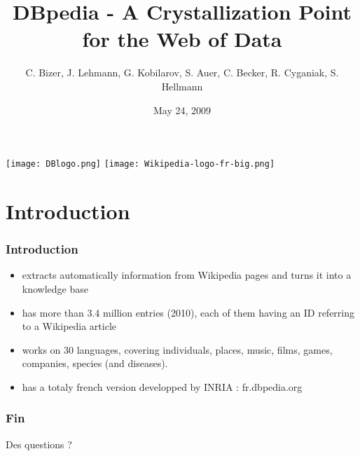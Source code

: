 \documentclass{beamer}
\title{DBpedia - A Crystallization Point for the Web of Data}
\author{C. Bizer, J. Lehmann, G. Kobilarov, S. Auer, C. Becker, R. Cyganiak, S. Hellmann}
\date{May 24, 2009}
\begin{document}
  	
  	\begin{frame}
  		
  		\begin{center}
  			\texttt{[image: DBlogo.png]} \text{                     } \texttt{[image: Wikipedia-logo-fr-big.png]}
  		\end{center}
  		\titlepage
  	\end{frame}
  	
  	\section{Introduction}
  	\begin{frame}
  		\frametitle{Introduction}
  		\begin{itemize}
  			\item extracts automatically information from Wikipedia pages and turns it into a knowledge base
  			\item has more than 3.4 million entries (2010), each of them having an ID referring to a Wikipedia article
  			\item works on 30 languages, covering individuals, places, music, films, games, companies, species (and diseases). 
  			\item has a totaly french version developped by INRIA : fr.dbpedia.org
  		\end{itemize}
  	\end{frame}
  	
  	
  	
  	
  	\begin{frame}
  		\frametitle{Fin}
  		Des questions ?
  	\end{frame}
  	
  
\end{document}
